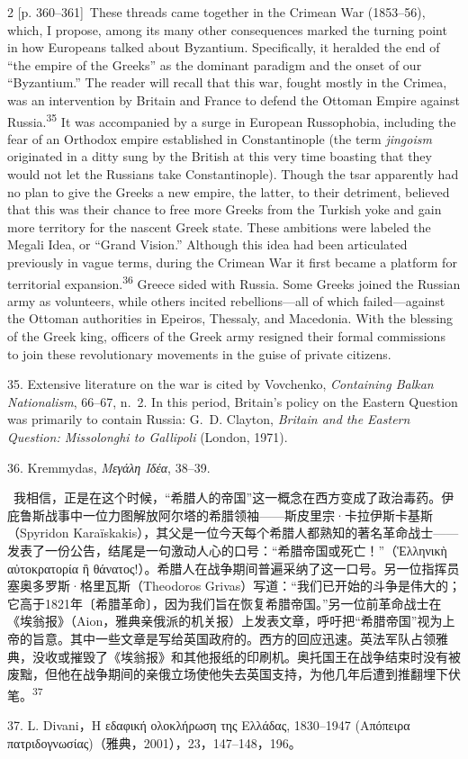 \documentclass[10pt,a4paper]{article}
\begin{document}
\begin{paracol}{2}
{\scriptsize\color{gray}[p. 360–361]}\ These threads came together in the Crimean War (1853–56), which, I propose, among its many other consequences marked the turning point in how Europeans talked about Byzantium. Specifically, it heralded the end of “the empire of the Greeks” as the dominant paradigm and the onset of our “Byzantium.” The reader will recall that this war, fought mostly in the Crimea, was an intervention by Britain and France to defend the Ottoman Empire against Russia.\nobreak\textsuperscript{35} It was accompanied by a surge in European Russophobia, including the fear of an Orthodox empire established in Constantinople (the term \textit{jingoism} originated in a ditty sung by the British at this very time boasting that they would not let the Russians take Constantinople). Though the tsar apparently had no plan to give the Greeks a new empire, the latter, to their detriment, believed that this was their chance to free more Greeks from the Turkish yoke and gain more territory for the nascent Greek state. These ambitions were labeled the Megali Idea, or “Grand Vision.” Although this idea had been articulated previously in vague terms, during the Crimean War it first became a platform for territorial expansion.\nobreak\textsuperscript{36} Greece sided with Russia. Some Greeks joined the Russian army as volunteers, while others incited rebellions—all of which failed—against the Ottoman authorities in Epeiros, Thessaly, and Macedonia. With the blessing of the Greek king, officers of the Greek army resigned their formal commissions to join these revolutionary movements in the guise of private citizens.\par{\small 35. Extensive literature on the war is cited by Vovchenko, \textit{Containing Balkan Nationalism}, 66–67, n. 2. In this period, Britain’s policy on the Eastern Question was primarily to contain Russia: G. D. Clayton, \textit{Britain and the Eastern Question: Missolonghi to Gallipoli} (London, 1971).\par}{\small 36. Kremmydas, \textit{Μεγάλη Ιδέα}, 38–39.\par}
\switchcolumn*
{\scriptsize\color{gray}[p. 361]}\ 我相信，正是在这个时候，“希腊人的帝国”这一概念在西方变成了政治毒药。伊庇鲁斯战事中一位力图解放阿尔塔的希腊领袖——斯皮里宗·卡拉伊斯卡基斯（Spyridon Karaïskakis），其父是一位今天每个希腊人都熟知的著名革命战士——发表了一份公告，结尾是一句激动人心的口号：“希腊帝国或死亡！”（Ἑλληνικὴ αὐτοκρατορία ἢ θάνατος!）。希腊人在战争期间普遍采纳了这一口号。另一位指挥员塞奥多罗斯·格里瓦斯（Theodoros Grivas）写道：“我们已开始的斗争是伟大的；它高于1821年〔希腊革命〕，因为我们旨在恢复希腊帝国。”另一位前革命战士在《埃翁报》（Aion，雅典亲俄派的机关报）上发表文章，呼吁把“希腊帝国”视为上帝的旨意。其中一些文章是写给英国政府的。西方的回应迅速。英法军队占领雅典，没收或摧毁了《埃翁报》和其他报纸的印刷机。奥托国王在战争结束时没有被废黜，但他在战争期间的亲俄立场使他失去英国支持，为他几年后遭到推翻埋下伏笔。\nobreak\textsuperscript{37}\par{\small 37. L. Divani，Η εδαφική ολοκλήρωση της Ελλάδας, 1830–1947 (Απόπειρα πατριδογνωσίας)（雅典，2001），23，147–148，196。\par}

\end{paracol}
\end{document}
